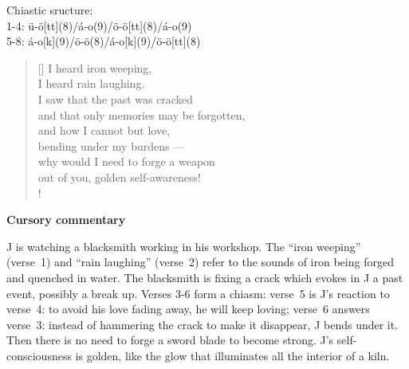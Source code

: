 \documentclass[a4paper,12pt,twoside,final]{book}
\begin{document}
\noindent Chiastic sructure: \\
1-4: ü-ö[tt](8)/á-o(9)/ö-ö[tt](8)/á-o(9) \\
5-8: á-o[k](9)/ö-ö(8)/á-o[k](9)/ö-ö[tt](8)

\newpage


\settowidth{\versewidth}{and that only a memory can be forgotten;}

\begin{verse}[\versewidth]
  I heard iron weeping, \\
  I heard rain laughing. \\
  I saw that the past was cracked \\
  and that only memories may be forgotten, \\
  and how I cannot but love, \\
  bending under my burdens --- \\
  why would I need to forge a weapon \\
  out of you, golden self-awareness! \\!
\end{verse}


\bigskip

\noindent \textbf{Cursory commentary}

\medskip

J is watching a blacksmith working in his workshop. The ``iron
weeping'' (verse~1) and ``rain laughing'' (verse~2) refer to the
sounds of iron being forged and quenched in water. The blacksmith is
fixing a crack which evokes in J a past event, possibly a break
up. Verses 3-6 form a chiasm: verse~5 is J's reaction to verse~4: to
avoid his love fading away, he will keep loving; verse~6 answers
verse~3: instead of hammering the crack to make it disappear, J bends
under it. Then there is no need to forge a sword blade to become
strong. J's self-consciousness is golden, like the glow that
illuminates all the interior of a kiln.

\newpage

\settowidth{\versewidth}{s hogy nem tudok mást, mint szeretni,}
\end{document}

